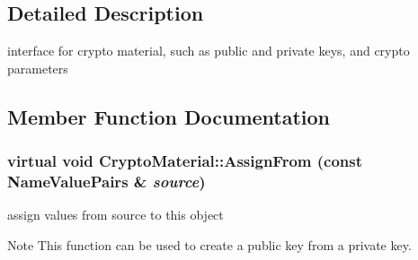 \subsection{Detailed Description}
interface for crypto material, such as public and private keys, and crypto parameters 

\subsection{Member Function Documentation}
\hypertarget{class_crypto_material_a20181c1b39a74a9fe91385b025b773c6}{
\subsubsection[{AssignFrom}]{\setlength{\rightskip}{0pt plus 5cm}virtual void CryptoMaterial::AssignFrom (const {\bf NameValuePairs} \& {\em source})}}
\label{class_crypto_material_a20181c1b39a74a9fe91385b025b773c6}


assign values from source to this object \begin{DoxyNote}{Note}
This function can be used to create a public key from a private key. 
\end{DoxyNote}


